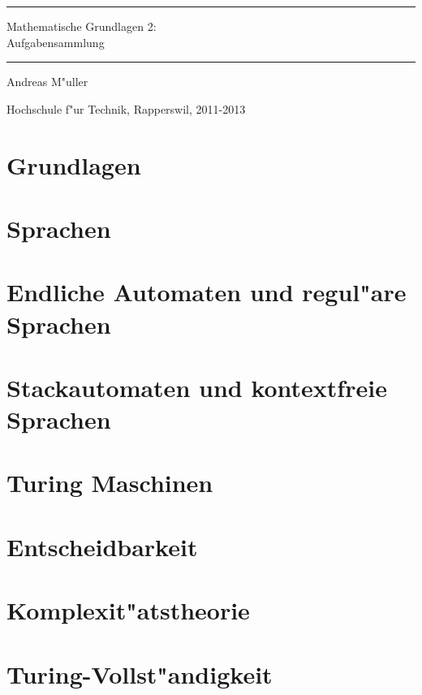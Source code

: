 \documentclass[a4paper,12pt]{book}
\begin{document}
\pagestyle{fancy}
\rhead{}
\frontmatter
\newcommand\HRule{\noindent\rule{\linewidth}{1.5pt}}
\begin{titlepage}
\HRule
\vspace*{2pt}
\begin{flushright}
{\Huge
Mathematische Grundlagen 2:\\
\bigskip
Aufgabensammlung}
\end{flushright}
\HRule
\begin{flushright}
\vspace{30pt}
\LARGE
Andreas M"uller
\end{flushright}
\begin{center}
Hochschule f"ur Technik, Rapperswil, 2011-2013
\end{center}
\end{titlepage}
\hypersetup{
        colorlinks=true,
        linktoc=all,
        linkcolor=blue
}
\tableofcontents
\newenvironment{beispiel}[1][Beispiel]{%
\begin{proof}[#1]%
\renewcommand{\qedsymbol}{$\bigcirc$}
}{\end{proof}}
\mainmatter


\chapter{Grundlagen}

\chapter{Sprachen}

\chapter{Endliche Automaten und regul"are Sprachen}

\chapter{Stackautomaten und kontextfreie Sprachen}

\chapter{Turing Maschinen}

\chapter{Entscheidbarkeit}

\chapter{Komplexit"atstheorie}

\chapter{Turing-Vollst"andigkeit}


\end{document}
